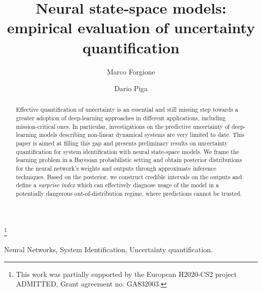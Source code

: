 \documentclass{ifacconf}
\begin{document}
\begin{frontmatter}

\title{Neural state-space models: empirical evaluation of uncertainty quantification} 

\thanks[footnoteinfo]{This work was partially supported by the European H2020-CS2 project ADMITTED, Grant agreement no. GA832003.}

\author{Marco Forgione} 
\author{Dario Piga} 

\address{IDSIA Dalle Molle Institute for Artificial Intelligence SUPSI-USI, Manno, Switzerland. (e-mail: marco.forgione@ supsi.ch; dario.piga@suspi.ch).}

\begin{abstract}                
Effective quantification of uncertainty is an essential and still missing step towards a greater adoption of deep-learning approaches in 
different applications, including mission-critical ones. In particular, investigations on the predictive uncertainty of deep-learning 
models describing non-linear dynamical systems are very limited to date. This paper is aimed at filling this gap and presents preliminary results on uncertainty quantification for system identification with neural state-space models. We frame the learning problem in a Bayesian probabilistic setting 
and obtain posterior distributions for the neural network's weights and outputs through approximate inference techniques.
Based on the posterior, we construct credible intervals on the outputs and define a \emph{surprise index} which can effectively diagnose usage of the model in a potentially dangerous out-of-distribution regime, where  predictions cannot be trusted.
\end{abstract}

\begin{keyword}
Neural Networks, System Identification, Uncertainty quantification.
\end{keyword}

\end{frontmatter}
\end{document}
